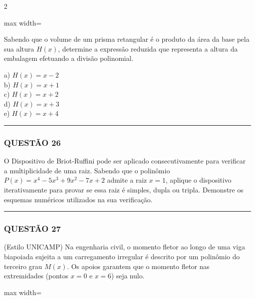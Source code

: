 \documentclass[11pt, a4paper]{article}
\begin{document}
\begin{multicols*}{2}
\begin{center}
\begin{adjustbox}{max width=\linewidth}
\end{adjustbox}
\end{center}

Sabendo que o volume de um prisma retangular é o produto da área da base pela sua altura $ H(x) $, determine a expressão reduzida que representa a altura da embalagem efetuando a divisão polinomial. 

a) $ H(x) = x - 2 $\\[0.3cm]
b) $ H(x) = x + 1 $\\[0.3cm]
c) $ H(x) = x + 2 $\\[0.3cm]
d) $ H(x) = x + 3 $\\[0.3cm]
e) $ H(x) = x + 4 $

\vspace{0cm} \noindent\textcolor{CorLinha}{\rule{\linewidth}{0.5pt}} \vspace{-0.2cm}
\subsubsection*{QUESTÃO 26}

O Dispositivo de Briot-Ruffini pode ser aplicado consecutivamente para verificar a multiplicidade de uma raiz. Sabendo que o polinômio $ P(x) = x^4 - 5x^3 + 9x^2 - 7x + 2 $ admite a raiz $ x = 1 $, aplique o dispositivo iterativamente para provar se essa raiz é simples, dupla ou tripla. Demonstre os esquemas numéricos utilizados na sua verificação.

\vspace{0cm} \noindent\textcolor{CorLinha}{\rule{\linewidth}{0.5pt}} \vspace{-0.2cm}
\subsubsection*{QUESTÃO 27}

(Estilo UNICAMP) Na engenharia civil, o momento fletor ao longo de uma viga biapoiada sujeita a um carregamento irregular é descrito por um polinômio do terceiro grau $ M(x) $. Os apoios garantem que o momento fletor nas extremidades (pontos $ x = 0 $ e $ x = 6 $) seja nulo.

\begin{center}
\begin{adjustbox}{max width=\linewidth}
\end{adjustbox}
\end{center}
\end{multicols*}
\end{document}
